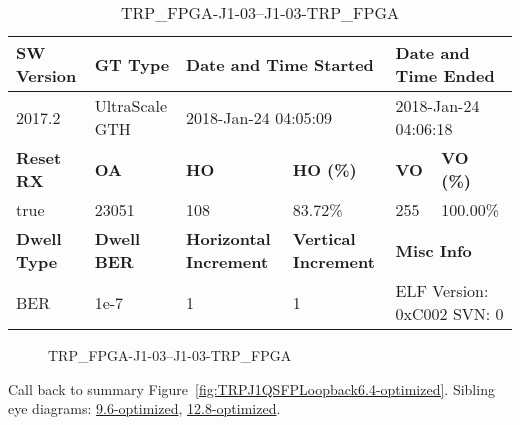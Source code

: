 \begin{table}[h]
\centering
\caption{TRP\_FPGA-J1-03--J1-03-TRP\_FPGA}
\label{tab:TRPFPGAJ103J103TRPFPGA6.4-optimized}
\begin{tabular}{@{}|l|l|l|l|l|l|@{}}
\toprule
\textbf{SW Version}                & \textbf{GT Type}   & \multicolumn{2}{l|}{\textbf{Date and Time Started}}            & \multicolumn{2}{l|}{\textbf{Date and Time Ended}}        \\ \midrule
2017.2                       & UltraScale GTH          & \multicolumn{2}{l|}{2018-Jan-24 04:05:09}                   & \multicolumn{2}{l|}{2018-Jan-24 04:06:18}               \\ \midrule
\textbf{Reset RX}                  & \textbf{OA} & \textbf{HO}   & \textbf{HO (\%)} & \textbf{VO} & \textbf{VO (\%)} \\ \midrule
true & 23051        & 108          & 83.72\%        & 255        & 100.00\%       \\ \midrule
\textbf{Dwell Type}                & \textbf{Dwell BER} & \textbf{Horizontal Increment} & \textbf{Vertical Increment}    & \multicolumn{2}{l|}{\textbf{Misc Info}}                  \\ \midrule
BER                            & 1e-7        & 1        & 1           & \multicolumn{2}{l|}{ELF Version: 0xC002 SVN: 0}                         \\ \bottomrule
\end{tabular}
\end{table}

\begin{figure}[h]
\caption{TRP\_FPGA-J1-03--J1-03-TRP\_FPGA} \label{fig:TRPFPGAJ103J103TRPFPGA6.4-optimized}
\end{figure}

Call back to summary Figure~\ref{fig:TRPJ1QSFPLoopback6.4-optimized}.
Sibling eye diagrams: \hyperref[sec:TRPFPGAJ103J103TRPFPGA9.6-optimized]{9.6-optimized}, \hyperref[sec:TRPFPGAJ103J103TRPFPGA12.8-optimized]{12.8-optimized}.

\clearpage
\newpage

